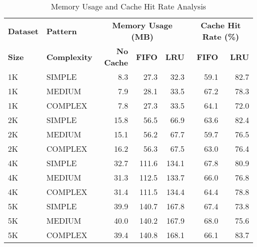 \begin{table}[htbp]
\centering
\caption{Memory Usage and Cache Hit Rate Analysis}
\label{tab:memory_cache_analysis}
\begin{tabular}{|l|l|r|r|r|r|r|}
\hline
\textbf{Dataset} & \textbf{Pattern} & \multicolumn{3}{c|}{\textbf{Memory Usage (MB)}} & \multicolumn{2}{c|}{\textbf{Cache Hit Rate (\%)}} \\
\textbf{Size} & \textbf{Complexity} & \textbf{No Cache} & \textbf{FIFO} & \textbf{LRU} & \textbf{FIFO} & \textbf{LRU} \\
\hline
1K & SIMPLE & 8.3 & 27.3 & 32.3 & 59.1 & 82.7 \\
1K & MEDIUM & 7.9 & 28.1 & 33.5 & 67.2 & 78.3 \\
1K & COMPLEX & 7.8 & 27.3 & 33.5 & 64.1 & 72.0 \\
2K & SIMPLE & 15.8 & 56.5 & 66.9 & 63.6 & 82.4 \\
2K & MEDIUM & 15.1 & 56.2 & 67.7 & 59.7 & 76.5 \\
2K & COMPLEX & 16.2 & 56.3 & 67.5 & 63.0 & 76.4 \\
4K & SIMPLE & 32.7 & 111.6 & 134.1 & 67.8 & 80.9 \\
4K & MEDIUM & 31.3 & 112.5 & 133.7 & 66.0 & 76.8 \\
4K & COMPLEX & 31.4 & 111.5 & 134.4 & 64.4 & 78.8 \\
5K & SIMPLE & 39.9 & 140.7 & 167.8 & 67.4 & 73.8 \\
5K & MEDIUM & 40.0 & 140.2 & 167.9 & 68.0 & 75.6 \\
5K & COMPLEX & 39.4 & 140.8 & 168.1 & 66.1 & 83.7 \\
\hline
\end{tabular}
\end{table}
